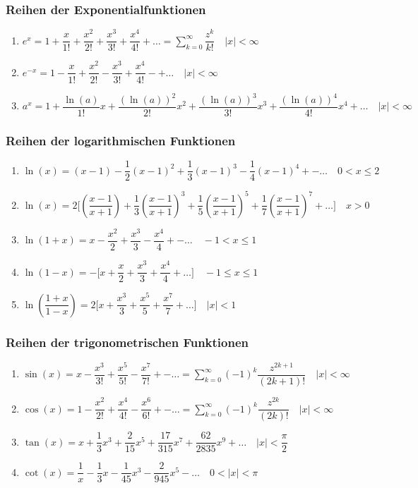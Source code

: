 \subsubsection{Reihen der Exponentialfunktionen}
\begin{enumerate}[$(a)$]
\item $e^x=1+\dfrac{x}{1!}+\dfrac{x^2}{2!}+\dfrac{x^3}{3!}+\dfrac{x^4}{4!}+\dotso=\displaystyle \sum_{k=0}^{\infty}\dfrac{z^k}{k!}\quad \Big\vert x\Big\vert< \infty$
\item $e^{-x}=1-\dfrac{x}{1!}+\dfrac{x^2}{2!}-\dfrac{x^3}{3!}+\dfrac{x^4}{4!}-+\dotso\quad \Big\vert x\Big\vert< \infty$
\item $a^x=1+\dfrac{\ln\left(a\right)}{1!}x+\dfrac{\left(\ln\left(a\right)\right)^2}{2!}x^2+\dfrac{\left(\ln\left(a\right)\right)^3}{3!}x^3+\dfrac{\left(\ln\left(a\right)\right)^4}{4!}x^4+\dotso\quad \Big\vert x\Big\vert< \infty$
\end{enumerate}
\subsubsection{Reihen der logarithmischen Funktionen}
\begin{enumerate}[$(a)$]
\item $\ln\left(x\right)=\left(x-1\right)-\dfrac{1}{2}\left(x-1\right)^2+\dfrac{1}{3}\left(x-1\right)^3-\dfrac{1}{4}\left(x-1\right)^4+-\dotso\quad 0<x\leq 2$
\item $\ln\left(x\right)=2\Big[\left(\dfrac{x-1}{x+1}\right)+\dfrac{1}{3}\left(\dfrac{x-1}{x+1}\right)^3+\dfrac{1}{5}\left(\dfrac{x-1}{x+1}\right)^5+\dfrac{1}{7}\left(\dfrac{x-1}{x+1}\right)^7+\dotso\Big]\quad x>0$
\item $\ln\left(1+x\right)=x-\dfrac{x^2}{2}+\dfrac{x^3}{3}-\dfrac{x^4}{4}+-\dotso\quad -1<x\leq 1$
\item $\ln\left(1-x\right)=-\Big[x+\dfrac{x}{2}+\dfrac{x^3}{3}+\dfrac{x^4}{4}+\dotso\Big]\quad -1\leq x\leq 1$
\item $\ln\left(\dfrac{1+x}{1-x}\right)=2\Big[x+\dfrac{x^3}{3}+\dfrac{x^5}{5}+\dfrac{x^7}{7}+\dotso\Big]\quad \Big\vert x\Big\vert<1$
\end{enumerate}
\subsubsection{Reihen der trigonometrischen Funktionen}
\begin{enumerate}[$(a)$]
\item $\sin\left(x\right)=x-\dfrac{x^3}{3!}+\dfrac{x^5}{5!}-\dfrac{x^7}{7!}+-\dotso=\displaystyle \sum_{k=0}^{\infty}\left(-1\right)^k\dfrac{z^{2k+1}}{\left(2k+1\right)!}\quad \Big\vert x\Big\vert<\infty$
\item $\cos\left(x\right)=1-\dfrac{x^2}{2!}+\dfrac{x^4}{4!}-\dfrac{x^6}{6!}+-\dotso=\displaystyle \sum_{k=0}^{\infty}\left(-1\right)^k\dfrac{z^{2k}}{\left(2k\right)!}\quad \Big\vert x\Big\vert<\infty$
\item $\tan\left(x\right)=x+\dfrac{1}{3}x^3+\dfrac{2}{15}x^5+\dfrac{17}{315}x^7+\dfrac{62}{2835}x^9+\dotso\quad \Big\vert x\Big\vert<\dfrac{\pi}{2}$
\item $\cot\left(x\right)=\dfrac{1}{x}-\dfrac{1}{3}x-\dfrac{1}{45}x^3-\dfrac{2}{945}x^5-\dotso\quad 0<\Big\vert x\Big\vert<\pi$
\end{enumerate}
